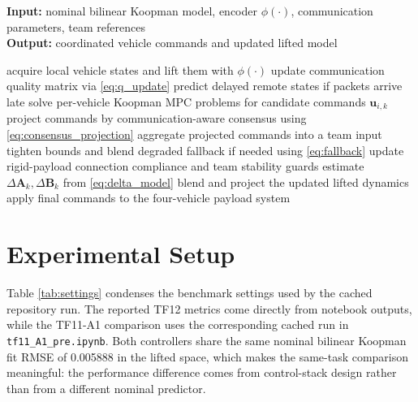 \documentclass[twocolumn,3p,times,procedia]{elsarticle}
\newcommand{\methodname}{NRCT-Koopman}
\newcommand{\tfone}{TF11-A1}
\newcommand{\tftwo}{TF12}
\begin{document}
\begin{algorithm}[h]
\footnotesize
\caption{\methodname{} online control loop}
\label{alg:mainloop}
\textbf{Input:} nominal bilinear Koopman model, encoder $\phi(\cdot)$, communication parameters, team references\\
\textbf{Output:} coordinated vehicle commands and updated lifted model
\begin{algorithmic}[1]
    \State acquire local vehicle states and lift them with $\phi(\cdot)$
    \State update communication quality matrix via \eqref{eq:q_update}
    \State predict delayed remote states if packets arrive late
    \State solve per-vehicle Koopman MPC problems for candidate commands $\bm{u}_{i,k}$
    \State project commands by communication-aware consensus using \eqref{eq:consensus_projection}
    \State aggregate projected commands into a team input
    \State tighten bounds and blend degraded fallback if needed using \eqref{eq:fallback}
    \State update rigid-payload connection compliance and team stability guards
        \State estimate $\Delta\bm{A}_{k},\Delta\bm{B}_{k}$ from \eqref{eq:delta_model}
        \State blend and project the updated lifted dynamics
    \EndIf
    \State apply final commands to the four-vehicle payload system
\EndFor
\end{algorithmic}
\end{algorithm}

\section{Experimental Setup}
Table \ref{tab:settings} condenses the benchmark settings used by the cached repository run. The reported \tftwo{} metrics come directly from notebook outputs, while the \tfone{} comparison uses the corresponding cached run in \texttt{tf11\_A1\_pre.ipynb}. Both controllers share the same nominal bilinear Koopman fit RMSE of 0.005888 in the lifted space, which makes the same-task comparison meaningful: the performance difference comes from control-stack design rather than from a different nominal predictor.
\end{document}
